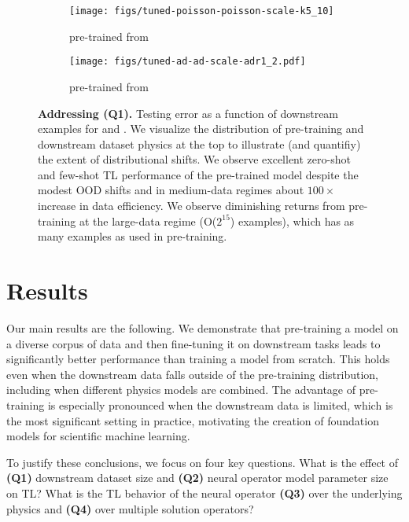 
\begin{figure*}[ht]
  \begin{subfigure}{.5\textwidth}
  \centering
  \texttt{[image: figs/tuned-poisson-poisson-scale-k5\_10]}  
  \caption{\sysAfiveten{} pre-trained from \sysAonefive{}}
  \label{fig:poisson-k5-10}
\end{subfigure}%
\begin{subfigure}{.5\textwidth}
  \centering
  \texttt{[image: figs/tuned-ad-ad-scale-adr1\_2.pdf]}  
  \caption{\sysBonetwo{} pre-trained from \sysBzeropttwoone{}}
  \label{fig:ad-adr1-2}
\end{subfigure}
\caption{\textbf{Addressing (Q1).} Testing error as a function of downstream examples  for \sysA{} and \sysB{}. 
We visualize the distribution of pre-training and downstream dataset physics at the top to illustrate (and quantifiy) the extent of distributional shifts.  We observe excellent zero-shot and few-shot TL performance of the pre-trained model despite the modest OOD shifts and in medium-data regimes about $100\times$ increase in data efficiency. We observe diminishing returns from pre-training at the large-data regime (O($2^{15}$) examples), which has as many examples as used in pre-training.
}
\label{fig:Q1}
\end{figure*}
\section{Results}
\label{sec:results}
Our main results are the following.
We demonstrate that pre-training a model on a diverse corpus of data and then fine-tuning it on downstream tasks leads to significantly better performance than training a model from scratch. 
This holds even when the downstream data falls outside of the pre-training distribution, including when different physics models are combined. 
The advantage of pre-training is especially pronounced when the downstream data is limited, which is the most significant setting in practice, motivating the creation of foundation models for scientific machine learning.

To justify these conclusions, we focus on four key questions. 
What is the effect of \textbf{(Q1)} downstream dataset size and \textbf{(Q2)} neural operator model parameter size on TL?  
What is the TL behavior of the neural operator \textbf{(Q3)} over the underlying physics and \textbf{(Q4)} over multiple solution operators? 


